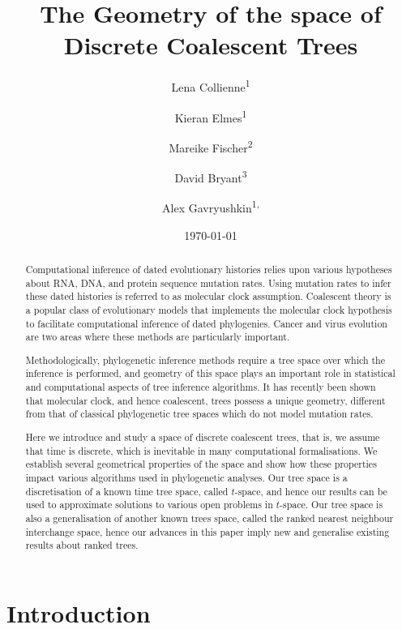 \documentclass[11pt]{amsart}
\title[Geometry of ranked tree spaces]{The Geometry of the space of Discrete Coalescent Trees}
\date{\today}
\author{Lena Collienne\textsuperscript{1}}
\author{Kieran Elmes\textsuperscript{1}}
\author{Mareike Fischer\textsuperscript{2}}
\author{David Bryant\textsuperscript{3}}
\author{Alex Gavryushkin\textsuperscript{1, \Letter}}
\begin{document}
\begin{abstract}
Computational inference of dated evolutionary histories relies upon various hypotheses about RNA, DNA, and protein sequence mutation rates.
Using mutation rates to infer these dated histories is referred to as molecular clock assumption.
Coalescent theory is a popular class of evolutionary models that implements the molecular clock hypothesis to facilitate computational inference of dated phylogenies.
Cancer and virus evolution are two areas where these methods are particularly important.

Methodologically, phylogenetic inference methods require a tree space over which the inference is performed, and geometry of this space plays an important role in statistical and computational aspects of tree inference algorithms.
It has recently been shown that molecular clock, and hence coalescent, trees possess a unique geometry, different from that of classical phylogenetic tree spaces which do not model mutation rates.

Here we introduce and study a space of discrete coalescent trees, that is, we assume that time is discrete, which is inevitable in many computational formalisations.
We establish several geometrical properties of the space and show how these properties impact various algorithms used in phylogenetic analyses.
Our tree space is a discretisation of a known time tree space, called $t$-space, and hence our results can be used to approximate solutions to various open problems in $t$-space.
Our tree space is also a generalisation of another known trees space, called the ranked nearest neighbour interchange space, hence our advances in this paper imply new and generalise existing results about ranked trees.
\end{abstract}

\maketitle


\section{Introduction}
\end{document}

